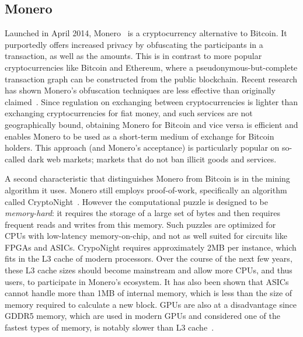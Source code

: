 \subsection{Monero}

Launched in April 2014, Monero~\cite{monero} is a cryptocurrency alternative to Bitcoin. It purportedly offers increased privacy by obfuscating the participants in a transaction, as well as the amounts. This is in contrast to more popular cryptocurrencies like Bitcoin and Ethereum, where a pseudonymous-but-complete transaction graph can be constructed from the public blockchain. Recent research has shown Monero's obfuscation techniques are less effective than originally claimed~\cite{MMLN17,kumar2017traceability}. Since regulation on exchanging between cryptocurrencies is lighter than exchanging cryptocurrencies for fiat money, and such services are not geographically bound, obtaining Monero for Bitcoin and vice versa is efficient and enables Monero to be used as a short-term medium of exchange for Bitcoin holders. This approach (and Monero's acceptance) is particularly popular on so-called dark web markets; markets that do not ban illicit goods and services.

A second characteristic that distinguishes Monero from Bitcoin is in the mining algorithm it uses. Monero still employs proof-of-work, specifically an algorithm called CryptoNight~\cite{cryptoknight}. However the computational puzzle is designed to be \textit{memory-hard}: it requires the storage of a large set of bytes and then requires frequent reads and writes from this memory. Such puzzles are optimized for CPUs with low-latency memory-on-chip, and not as well suited for circuits like FPGAs and ASICs. CrypoNight requires approximately 2MB per instance, which fits in the L3 cache of modern processors. Over the course of the next few years, these L3 cache sizes should become mainstream and allow more CPUs, and thus users, to participate in Monero's ecosystem. It has also been shown that ASICs cannot handle more than 1MB of internal memory, which is less than the size of memory required to calculate a new block. GPUs are also at a disadvantage since GDDR5 memory, which are used in modern GPUs and considered one of the fastest types of memory, is notably slower than L3 cache~\cite{van2013cryptonote}.  

%
%
%
%
%
%

